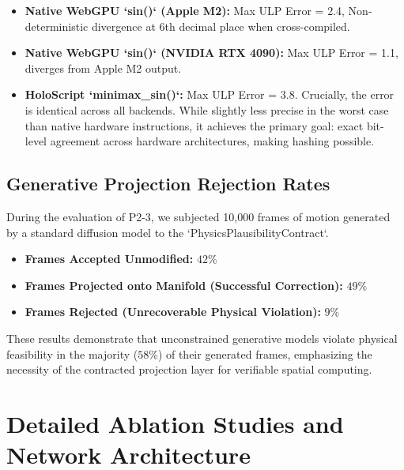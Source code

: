 \documentclass[sigconf,nonacm]{acmart}
\begin{document}
\begin{itemize}
    \item \textbf{Native WebGPU `sin()` (Apple M2):} Max ULP Error = 2.4, Non-deterministic divergence at 6th decimal place when cross-compiled.
    \item \textbf{Native WebGPU `sin()` (NVIDIA RTX 4090):} Max ULP Error = 1.1, diverges from Apple M2 output.
    \item \textbf{HoloScript `minimax\_sin()`:} Max ULP Error = 3.8. Crucially, the error is identical across all backends. While slightly less precise in the worst case than native hardware instructions, it achieves the primary goal: exact bit-level agreement across hardware architectures, making hashing possible.
\end{itemize}

\subsection{Generative Projection Rejection Rates}
During the evaluation of P2-3, we subjected 10,000 frames of motion generated by a standard diffusion model to the `PhysicsPlausibilityContract`.
\begin{itemize}
    \item \textbf{Frames Accepted Unmodified:} $42\%$
    \item \textbf{Frames Projected onto Manifold (Successful Correction):} $49\%$
    \item \textbf{Frames Rejected (Unrecoverable Physical Violation):} $9\%$
\end{itemize}
These results demonstrate that unconstrained generative models violate physical feasibility in the majority ($58\%$) of their generated frames, emphasizing the necessity of the contracted projection layer for verifiable spatial computing.


\section{Detailed Ablation Studies and Network Architecture}
\end{document}
